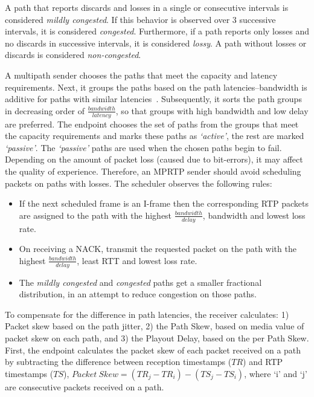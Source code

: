 A path that reports discards and losses in a single or consecutive intervals
is considered \emph{mildly congested}. If this behavior is observed over 3
successive intervals, it is considered \emph{congested}. Furthermore, if a
path reports only losses and no discards in successive intervals, it is
considered \emph{lossy}. A path without losses or discards is considered
\emph{non-congested}.

A multipath sender chooses the paths that meet the capacity and latency
requirements. Next, it groups the paths based on the path latencies--bandwidth
is additive for paths with similar latencies~\cite{Wischik:2008:RPP}.
Subsequently, it sorts the path groups in decreasing order of
$\frac{bandwidth}{latency}$, so that groups with high bandwidth and low delay
are preferred. The endpoint chooses the set of paths from the groups that meet
the capacity requirements and marks these paths as \emph{`active'}, the rest
are marked \emph{`passive'}. The \emph{`passive'} paths are used when the
chosen paths begin to fail. Depending on the amount of packet loss (caused due
to bit-errors), it may affect the quality of experience. Therefore, an MPRTP
sender should avoid scheduling packets on paths with losses. The scheduler
observes the following rules:

\begin{itemize}
\setlength{\itemsep}{0pt}

  \item If the next scheduled frame is an I-frame then the corresponding RTP
  packets are assigned to the path with the highest $\frac{bandwidth}{delay}$,
  bandwidth and lowest loss rate.

  \item On receiving a NACK, transmit the requested packet on the path with
  the highest $\frac{bandwidth}{delay}$, least RTT and lowest loss rate.

  \item The \emph{mildly congested} and \emph{congested} paths get a smaller
  fractional distribution, in an attempt to reduce congestion on those paths.

\end{itemize}

To compensate for the difference in path latencies, the receiver calculates:
1) Packet skew based on the path jitter, 2) the Path Skew, based on media
value of packet skew on each path, and 3) the Playout Delay, based on the per
Path Skew. First, the endpoint calculates the packet skew of each packet
received on a path by subtracting the difference between reception timestamps
($TR$) and RTP timestamps ($TS$), $Packet\ Skew = (TR_j - TR_i) - (TS_j -
TS_i)$, where `i' and `j' are consecutive packets received on a path.


